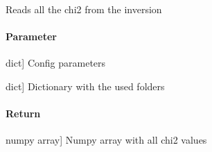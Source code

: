 \documentclass[letterpaper,10pt,english]{sphinxmanual}
\begin{document}

\begin{fulllineitems}
\label{\detokenize{functions:sir.read_chi2s}}
\pysigstartsignatures
{}
\pysigstopsignatures
\sphinxAtStartPar
Reads all the chi2 from the inversion


\paragraph{Parameter}
\label{\detokenize{functions:id5}}\begin{description}
\sphinxlineitem{config}{[}dict{]}
\sphinxAtStartPar
Config parameters

\sphinxlineitem{tasks}{[}dict{]}
\sphinxAtStartPar
Dictionary with the used folders

\end{description}


\paragraph{Return}
\label{\detokenize{functions:id6}}\begin{description}
\sphinxlineitem{chi2}{[}numpy array{]}
\sphinxAtStartPar
Numpy array with all chi2 values

\end{description}

\end{fulllineitems}

\end{document}
